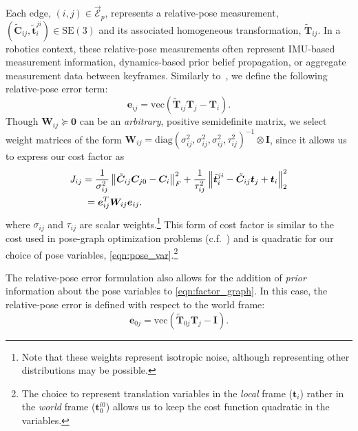 \documentclass[lettersize,journal]{IEEEtran}
\newcommand{\EdgeSet}{\vec{\bm{\mathcal{E}}}}
\newcommand{\vect}[1]{\mbox{vec}(#1)}
\newcommand{\diag}[1]{\mbox{diag}\left(#1\right)}
\begin{document}
Each edge, $(i,j) \in \EdgeSet_p $, represents a relative-pose measurement, $(\tilde{\bm{C}}_{ij},\tilde{\bm{t}}_i^{ji}) \in \mbox{SE}(3)$ and its associated homogeneous transformation, $\tilde{\bm{T}}_{ij}$.  In a robotics context, these relative-pose measurements often represent IMU-based measurement information, dynamics-based prior belief propagation, or aggregate measurement data between keyframes. Similarly to~\cite{brialesCartanSyncFastGlobal2017}, we define the following relative-pose error term:
\begin{equation}\label{eqn:rel_pose_err}
	\bm{e}_{ij} = \vect{\tilde{\bm{T}}_{ij}\bm{T}_j - \bm{T}_i}.
\end{equation}
Though $\bm{W}_{ij} \succeq \bm{0} $ can be an \emph{arbitrary}, positive semidefinite matrix, we select weight matrices of the form $\bm{W}_{ij}=\diag{\sigma^2_{ij},\sigma^2_{ij},\sigma^2_{ij},\tau^2_{ij}}^{-1} \otimes \bm{I}$, since it allows us to express our cost factor as
\begin{align}\label{eqn:rel_pose_cost}
	J_{ij} &= \frac{1}{\sigma^2_{ij}} \left\Vert \tilde{\bm{C}}_{ij}\bm{C}_{j0} - \bm{C}_i\right\Vert_F^2 + \frac{1}{\tau^2_{ij}} \left\Vert \tilde{\bm{t}}^{ji}_{i} - \tilde{\bm{C}}_{ij}\bm{t}_j + \bm{t}_i \right\Vert_2^2 \nonumber\\
	&\hspace*{3pt}=\bm{e}_{ij}^T \bm{W}_{ij} \bm{e}_{ij}.
\end{align}
where $\sigma_{ij}$ and $\tau_{ij}$ are scalar weights.\footnote{Note that these weights represent isotropic noise, although representing other distributions may be possible.} This form of cost factor is similar to the cost used in pose-graph optimization problems (c.f.~\cite{brialesCartanSyncFastGlobal2017, rosenSESyncCertifiablyCorrect2019, holmesEfficientGlobalOptimality2023}) and is quadratic for our choice of pose variables, \eqref{eqn:pose_var}.\footnote{The choice to represent translation variables in the \emph{local} frame ($\bm{t}_i$) rather in the \emph{world} frame ($\bm{t}_0^{i0}$) allows us to keep the cost function quadratic in the variables.}

The relative-pose error formulation also allows for the addition of \emph{prior} information about the pose variables to \eqref{eqn:factor_graph}. In this case, the relative-pose error is defined with respect to the world frame:
\begin{equation}\label{eqn:prior_pose_err}
	\bm{e}_{0j} = \vect{\tilde{\bm{T}}_{0j}\bm{T}_j - \bm{I}}.
\end{equation}
\end{document}
